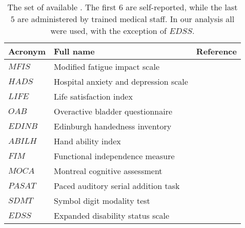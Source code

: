 
\begin{table}[htb]
	\center
	\footnotesize
	\begin{tabular}{l|l|l}%
		\toprule
		\textbf{Acronym} & \textbf{Full name} & \textbf{Reference} \\
		\midrule
		$MFIS$ & Modified fatigue impact scale & \cite{flachenecker2002fatigue}\\
		$HADS$ & Hospital anxiety and depression scale &  \cite{honarmand2009validation}\\
		$LIFE$ &  Life satisfaction index &  \cite{franchignoni1999life}\\
		$OAB$ & Overactive bladder questionnaire & \cite{cardozo2014validation}\\
		$EDINB$ &  Edinburgh handedness inventory & \cite{oldfield1971assessment} \\
		$ABILH$ &  Hand ability index & \cite{arnould2012can} \\
		\midrule
		$FIM$ &  Functional independence measure  &\cite{granger1990functional}\\
		$MOCA$ &  Montreal cognitive assessment & \cite{dagenais2013value}\\
		$PASAT$ &  Paced auditory serial addition task & \cite{aupperle2002three} \\
		$SDMT$ &  Symbol digit modality test  & \cite{parmenter2007screening}\\
		$EDSS$ & Expanded disability status scale & \cite{kurtzke1983rating}\\
		\bottomrule
	\end{tabular}
	\caption{The set of available \PCOs.
		The first $6$ are self-reported, while the last $5$ are administered by trained medical staff.
		In our analysis all \PCOs were used, with the exception of $EDSS$.
	}\label{tab:proms}
\end{table}


